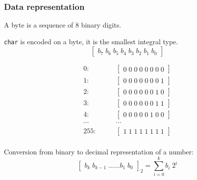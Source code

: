 \begin{frame}
  \frametitle{Data representation}


A byte is a sequence of 8 binary digits.

\texttt{char} is encoded on a byte, it is the smallest integral type.
\begin{equation*}
\begin{bmatrix}b_7\;b_6\;b_5\;b_4\;b_3\;b_2\;b_1\;b_0 \end{bmatrix}
\end{equation*}

\begin{eqnarray*}
0 :&\qquad\begin{bmatrix}0\;0\;0\;0\;0\;0\;0\;0 \end{bmatrix}\\
1 :&\qquad\begin{bmatrix}0\;0\;0\;0\;0\;0\;0\;1 \end{bmatrix}\\
2 :&\qquad\begin{bmatrix}0\;0\;0\;0\;0\;0\;1\;0 \end{bmatrix}\\
3 :&\qquad\begin{bmatrix}0\;0\;0\;0\;0\;0\;1\;1 \end{bmatrix}\\
4 :&\qquad\begin{bmatrix}0\;0\;0\;0\;0\;1\;0\;0 \end{bmatrix}\\
\cdots&\qquad\cdots\\
255:&\qquad\begin{bmatrix}1\;1\;1\;1\;1\;1\;1\;1 \end{bmatrix}\\
\end{eqnarray*}

Conversion from binary to decimal representation of a number:
\begin{equation*}
\begin{bmatrix}b_k\;b_{k-1}\;\dots\dots b_1\;b_0 \end{bmatrix}_2 = \sum^{k}_{i = 0} b_i\;2^i
\end{equation*}

\end{frame}

